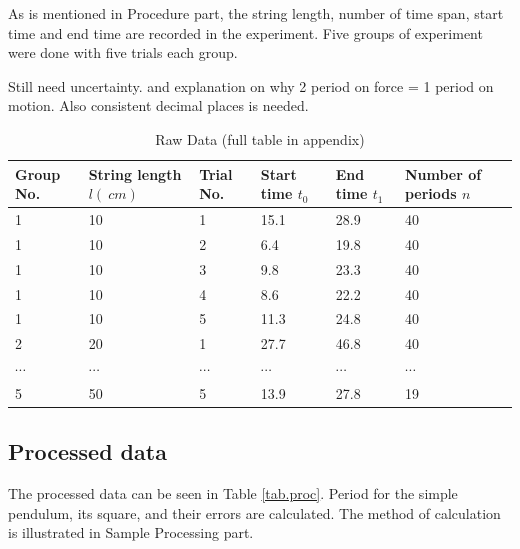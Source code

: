 \documentclass[a4paper]{article}
\newcommand{\grayrow}{\rowcolor[gray]{0.925}}
\begin{document}
As is mentioned in Procedure part, the string length, number of time span, start time and end time are recorded in the experiment. Five groups of experiment were done with five trials each group. 

\begin{table}[!ht]
    \centering
    \caption{Raw Data (full table in appendix)}
    \begin{tcolorbox}[title = Note]
        Still need uncertainty. and explanation on why 2 period on force = 1 period on motion.
        Also consistent decimal places is needed. 
    \end{tcolorbox}
    \label{tab.rawd}
    \begin{tabularx}{\textwidth}{p{1cm} X p{1cm} X X X}
    \hline
        Group No. & String length $l(\SI{}{cm})$ & Trial No. & Start time $t_0$ & End time $t_1$ & Number of periods $n$ \\ \hline
        \grayrow 1 & 10 & 1 & 15.1 & 28.9 & 40  \\ %
        1 & 10 & 2 & 6.4 & 19.8 & 40  \\ %
        \grayrow 1 & 10 & 3 & 9.8 & 23.3 & 40  \\ %
        1 & 10 & 4 & 8.6 & 22.2 & 40  \\ %
        \grayrow 1 & 10 & 5 & 11.3 & 24.8 & 40  \\ %
        2 & 20 & 1 & 27.7 & 46.8 & 40  \\ %
        \grayrow$\cdots$ & $\cdots$ & $\cdots$ & $\cdots$ & $\cdots$ & $\cdots$ \\ %
        5 & 50 & 5 & 13.9 & 27.8 & 19  \\ \hline
    \end{tabularx}
\end{table}

\subsection{Processed data}

The processed data can be seen in Table \ref{tab.proc}. Period for the simple pendulum, its square, and their errors are calculated. The method of calculation is illustrated in Sample Processing part.
\end{document}
